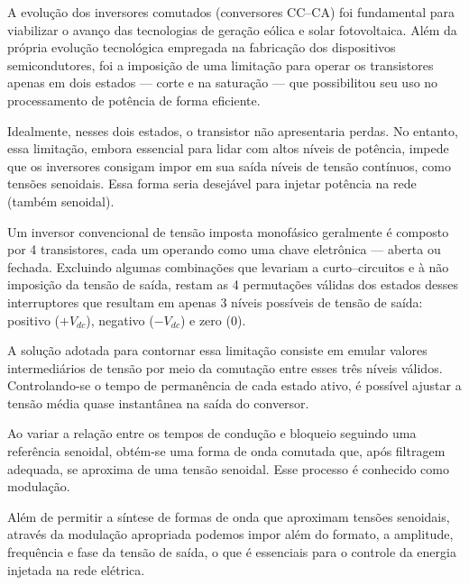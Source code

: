 A evolução dos inversores comutados (conversores CC--CA) foi fundamental para viabilizar o avanço das tecnologias de
geração eólica e solar fotovoltaica.
Além da própria evolução tecnológica empregada na fabricação dos dispositivos semicondutores, foi a imposição de uma
limitação para operar os transistores apenas em dois estados --- corte e na saturação --- que possibilitou seu uso no
processamento de potência de forma eficiente.

Idealmente, nesses dois estados, o transistor não apresentaria perdas.
No entanto, essa limitação, embora essencial para lidar com altos níveis de potência, impede que os inversores consigam
impor em sua saída níveis de tensão contínuos, como tensões senoidais.
Essa forma seria desejável para injetar potência na rede (também senoidal).

Um inversor convencional de tensão imposta monofásico geralmente é composto por 4 transistores, cada um operando como uma
chave eletrônica --- aberta ou fechada.
Excluindo algumas combinações que levariam a curto--circuitos e à não imposição da tensão de saída, restam as
4 permutações válidas dos estados desses interruptores que resultam em apenas 3 níveis possíveis de tensão de saída:
positivo ($+V_{dc}$), negativo ($-V_{dc}$) e zero ($0$).

A solução adotada para contornar essa limitação consiste em emular valores intermediários de tensão por meio da
comutação entre esses três níveis válidos.
Controlando-se o tempo de permanência de cada estado ativo, é possível ajustar a tensão média quase instantânea na
saída do conversor.

Ao variar a relação entre os tempos de condução e bloqueio seguindo uma referência senoidal, obtém-se uma forma de onda
comutada que, após filtragem adequada, se aproxima de uma tensão senoidal.
Esse processo é conhecido como modulação.

Além de permitir a síntese de formas de onda que aproximam tensões senoidais, através da modulação
apropriada podemos impor além do formato, a amplitude, frequência e fase da tensão de saída, o que é essenciais
para o controle da energia injetada na rede elétrica.





